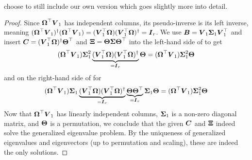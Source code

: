 choose to still include our own version which goes slightly more into detail.
\begin{proof}
    Since $\boldsymbol{\Omega}^{\top} \boldsymbol{V}_1$ has independent columns, its pseudo-inverse
    is its left inverse, meaning 
    $(\boldsymbol{\Omega}^{\top} \boldsymbol{V}_1)^{\dagger} (\boldsymbol{\Omega}^{\top} \boldsymbol{V}_1) = ( \boldsymbol{V}_1^{\top}\boldsymbol{\Omega}) ( \boldsymbol{V}_1^{\top}\boldsymbol{\Omega})^{\dagger} = \boldsymbol{I}_r$.
    We use $\boldsymbol{B} = \boldsymbol{V}_1 \boldsymbol{\Sigma}_1 \boldsymbol{V}_1^{\top}$ and insert
    $\boldsymbol{C} = (\boldsymbol{V}_1^{\top} \boldsymbol{\Omega})^{\dagger} \boldsymbol{\Theta}^{\top}$
    and $\boldsymbol{\Xi} = \boldsymbol{\Theta} \boldsymbol{\Sigma} \boldsymbol{\Theta}^{\top}$ into the
    left-hand side of  to get
    \begin{equation}
        (\boldsymbol{\Omega}^{\top} \boldsymbol{V}_1) \boldsymbol{\Sigma}_1^2 \underbrace{(\boldsymbol{V}_1^{\top} \boldsymbol{\Omega}) (\boldsymbol{V}_1^{\top} \boldsymbol{\Omega})^{\dagger}}_{=\boldsymbol{I}_r} \boldsymbol{\Theta} = (\boldsymbol{\Omega}^{\top} \boldsymbol{V}_1) \boldsymbol{\Sigma}_1^2 \boldsymbol{\Theta}
    \end{equation}
    and on the right-hand side of  for
    \begin{equation}
        (\boldsymbol{\Omega}^{\top} \boldsymbol{V}_1) \boldsymbol{\Sigma}_1 \underbrace{(\boldsymbol{V}_1^{\top} \boldsymbol{\Omega}) (\boldsymbol{V}_1^{\top} \boldsymbol{\Omega})^{\dagger}}_{=\boldsymbol{I}_r} \underbrace{\boldsymbol{\Theta} \boldsymbol{\Theta}^{\top}}_{=\boldsymbol{I}_r} \boldsymbol{\Sigma}_1 \boldsymbol{\Theta} = (\boldsymbol{\Omega}^{\top} \boldsymbol{V}_1) \boldsymbol{\Sigma}_1^2 \boldsymbol{\Theta}
    \end{equation}
    Now that $\boldsymbol{\Omega}^{\top} \boldsymbol{V}_1$ has linearly independent columns, $\boldsymbol{\Sigma}_1$ is a non-zero
    diagonal matrix, and $\boldsymbol{\Theta}$ is a permutation, we conclude that
    the given $\boldsymbol{C}$ and $\boldsymbol{\Xi}$ indeed solve the generalized eigenvalue problem.
    By the uniqueness of generalized eigenvalues and eigenvectors (up to
    permutation and scaling), these are indeed the only solutions.


\end{proof}
